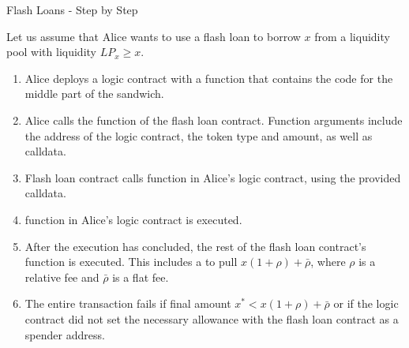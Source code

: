 \documentclass[]{beamer}
\begin{document}
\begin{frame}{Flash Loans - Step by Step}

\small

Let us assume that Alice wants to use a flash loan to borrow $x$ from a liquidity pool with liquidity $LP_x \geq x$. \\

\begin{enumerate}
	\item<2->[1.] Alice deploys a logic contract with a  function that contains the code for the middle part of the sandwich. %
	\item<3->[2a.] Alice calls the  function of the flash loan contract. Function arguments include the address of the logic contract, the token type and amount, as well as calldata.
	\item<4->[2b.] Flash loan contract calls  function in Alice's logic contract, using the provided calldata.
	\item<5->[2c.]  function in Alice's logic contract is executed.
	\item<6->[2d.] After the execution has  concluded, the rest of the flash loan contract's  function is executed. This includes a  to pull $x(1+\rho)+\bar{\rho}$, where $\rho$ is a relative fee and $\bar{\rho}$ is a flat fee.
	\item<7->[2e.] The entire transaction fails if final amount $x^* < x(1+\rho)+\bar{\rho}$ or if the logic contract did not set the necessary allowance with the flash loan contract as a spender address.
\end{enumerate}

\end{frame}
\end{document}
